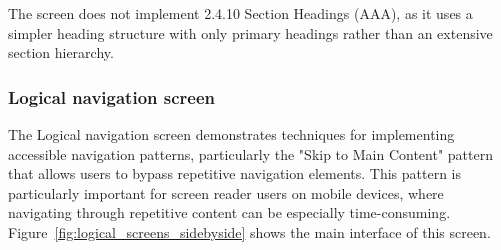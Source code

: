 The screen does not implement 2.4.10 Section Headings (AAA), as it uses a simpler heading structure with only primary headings rather than an extensive section hierarchy.

\subsubsection{Logical navigation screen}
\label{subsubsec:logical-navigation}

The Logical navigation screen demonstrates techniques for implementing accessible navigation patterns, particularly the "Skip to Main Content" pattern that allows users to bypass repetitive navigation elements. This pattern is particularly important for screen reader users on mobile devices, where navigating through repetitive content can be especially time-consuming. Figure~\ref{fig:logical_screens_sidebyside} shows the main interface of this screen.

